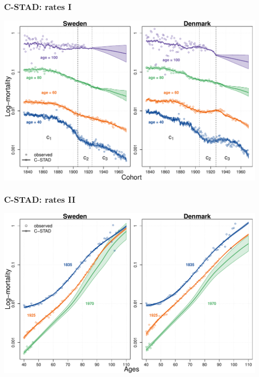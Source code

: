 \documentclass[12pt, xcolor=table]{beamer}  %
\begin{document}
\begin{frame}[noframenumbering]\frametitle{C-STAD: rates I}
	
	\vspace{-0.5cm}
	
	
	\begin{center}	
		\vspace{0.2cm}
		
		\includegraphics[scale=.42]{Figures/Ch4/F7a}
		
	\end{center}
	
\end{frame}

\begin{frame}[noframenumbering]\frametitle{C-STAD: rates II}
	
	\vspace{-0.5cm}
	
	
	\begin{center}	
		\vspace{0.2cm}
		
		\includegraphics[scale=.42]{Figures/Ch4/F7b}
		
	\end{center}
	
\end{frame}
\end{document}

